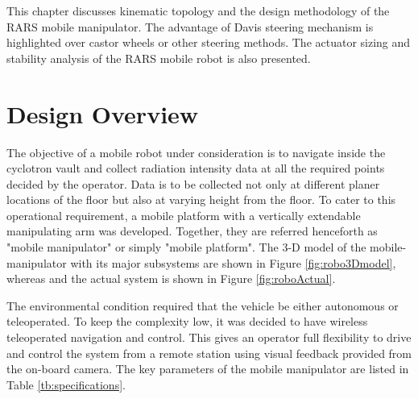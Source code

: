 This chapter   discusses kinematic topology and  the  design methodology of the RARS mobile manipulator. The advantage of  Davis steering mechanism is highlighted over castor wheels  or other steering methods. The actuator sizing and stability analysis of the RARS mobile robot is also presented.    %
\section{Design Overview}
 The objective of a  mobile robot under consideration is to navigate inside the cyclotron vault and collect radiation intensity data at all the required points decided by the operator. Data is to be collected not only at different planer locations of the floor but also at varying height from the floor. To cater to this operational requirement, a mobile platform with a vertically extendable manipulating arm was developed. Together, they are   referred henceforth as "mobile manipulator" or simply "mobile platform". The 3-D model of the mobile-manipulator with its major subsystems are shown in Figure \ref{fig:robo3Dmodel}, whereas  and the actual   system  is shown in Figure  \ref{fig:roboActual}. 

 The environmental condition required that the vehicle be either  autonomous or teleoperated. To keep the complexity low, it was decided to have wireless teleoperated   navigation and control. This gives an  operator full flexibility to drive  and control the system from a remote station  using  visual  feedback provided from the on-board camera. The key parameters of the mobile manipulator are listed in  Table \ref{tb:specifications}.

